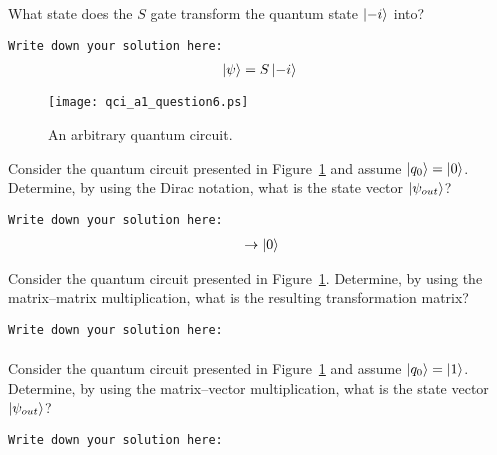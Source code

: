 {{{\begin{question}
What state does the $S$ gate transform the quantum state $\ket{-i}$ into?
\label{qst:assignment1_5}
\end{question}
{\small
\texttt{Write down your solution here:}
\begin{equation*}
  \begin{split}
    \ket{\psi} &= S \ket{-i} \\
  \end{split}
\end{equation*}}
\vspace{0.1cm}
\begin{figure}[t]
  \centerline{\texttt{[image: qci\_a1\_question6.ps]}}
  \caption{An arbitrary quantum circuit.}
  \label{fig:circuit1}
\end{figure}
\begin{question}
Consider the quantum circuit presented in Figure~\ref{fig:circuit1} and assume $\ket{q_{0}} = \ket{0}$. Determine, by using the Dirac notation, what is the state vector $\ket{\psi_{out}}$?
\label{qst:assignment1_6}
\end{question}
{\small
\texttt{Write down your solution here:}
\begin{equation*}
  \begin{split}
      &\rightarrow \ket{0} \\
  \end{split}
\end{equation*}}
\vspace{0.1cm}
\begin{question}
Consider the quantum circuit presented in Figure~\ref{fig:circuit1}. Determine, by using the matrix--matrix multiplication, what is the resulting transformation matrix?
\label{qst:assignment1_7}
\end{question}
{\small
\texttt{Write down your solution here:}
\begin{equation*}
  \begin{split}
  \end{split}
\end{equation*}}
\vspace{0.1cm}
\begin{question}
Consider the quantum circuit presented in Figure~\ref{fig:circuit1} and assume $\ket{q_{0}} = \ket{1}$. Determine, by using the matrix--vector multiplication, what is the state vector $\ket{\psi_{out}}$?
\label{qst:assignment1_8}
\end{question}
{\small
\texttt{Write down your solution here:}
}}}}
